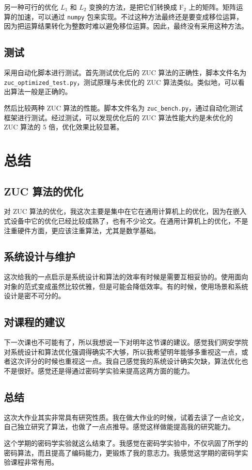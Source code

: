 \documentclass[a4paper, 10pt]{article}
\begin{document}
另一种可行的优化 $ L_1 $ 和 $ L_2 $ 变换的方法，是把它们转换成 $ \mathrm{F}_2 $ 上的矩阵。矩阵运算的加速，可以通过 \verb|numpy| 包来实现。不过这种方法最终还是要变成移位运算，因为把运算结果转化为整数时难以避免移位运算。因此，最终没有采用这种方法。

\subsection*{测试}

采用自动化脚本进行测试。首先测试优化后的 ZUC 算法的正确性，脚本文件名为 \verb|zuc_optimized_test.py|，测试原理与未优化的 ZUC 算法类似。类似地，可以看出算法一般是正确的。

然后比较两种 ZUC 算法的性能。脚本文件名为 \verb|zuc_bench.py|，通过自动化测试框架进行测试。经过测试，可以发现优化后的 ZUC 算法性能大约是未优化的 ZUC 算法的 5 倍，优化效果比较显著。

\section*{总结}

\subsection*{ZUC 算法的优化}

对 ZUC 算法的优化，我这次主要是集中在它在通用计算机上的优化，因为在嵌入式设备中它的优化已经比较成熟了，也有不少论文。在通用计算机上的优化，不是注重硬件方面，更应该注重算法，尤其是数学基础。

\subsection*{系统设计与维护}

这次给我的一点启示是系统设计和算法的效率有时候是需要互相妥协的。使用面向对象的范式变成虽然比较优雅，但是可能会降低效率。有的时候，使用场景和系统设计是密不可分的。

\subsection*{对课程的建议}

下一次课也不可能有了，所以我想说一下对明年这节课的建议。感觉我们网安学院对系统设计和算法优化强调得确实不大够，所以我希望明年能够多重视这一点，或者这次评分的时候也重视这一点。我自己感觉我的系统设计确实欠缺，算法优化也不是很好。感觉还是得通过密码学实验来提高这两方面的能力。

\subsection*{总结}

这次大作业其实非常具有研究性质。我在做大作业的时候，试着去读了一点论文，自己独立研究了算法，也做了一点点推导。感觉这样做能提高我的研究能力。

这个学期的密码学实验就这么结束了。我感觉在密码学实验中，不仅巩固了所学的密码算法，而且提高了编码能力，更锻炼了我的意志力。我感觉这学期的密码学实验课程非常有用。
\end{document}
